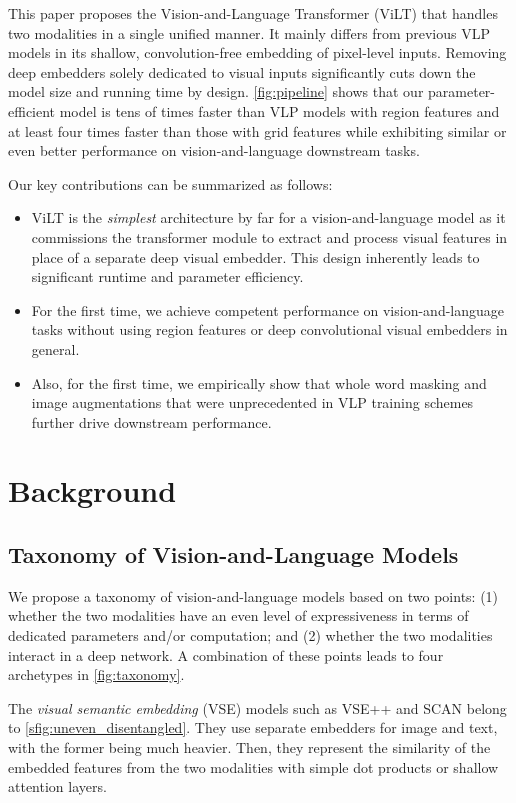 \documentclass{article}
\begin{document}
This paper proposes the Vision-and-Language Transformer (ViLT) that handles two modalities in a single unified manner.
It mainly differs from previous VLP models in its shallow, convolution-free embedding of pixel-level inputs.
Removing deep embedders solely dedicated to visual inputs significantly cuts down the model size and running time by design.
\cref{fig:pipeline} shows that our parameter-efficient model is tens of times faster than VLP models with region features and at least four times faster than those with grid features while exhibiting similar or even better performance on vision-and-language downstream tasks.

Our key contributions can be summarized as follows:
\begin{itemize}
    \item ViLT is the \textit{simplest} architecture by far for a vision-and-language model as it commissions the transformer module to extract and process visual features in place of a separate deep visual embedder. This design inherently leads to significant runtime and parameter efficiency.
    \item For the first time, we achieve competent performance on vision-and-language tasks without using region features or deep convolutional visual embedders in general. 
    \item Also, for the first time, we empirically show that whole word masking and image augmentations that were unprecedented in VLP training schemes further drive downstream performance.
\end{itemize}

\section{Background}
\label{sec:background}

\subsection{Taxonomy of Vision-and-Language Models}

We propose a taxonomy of vision-and-language models based on two points: (1) whether the two modalities have an even level of expressiveness in terms of dedicated parameters and/or computation; and (2) whether the two modalities interact in a deep network.
A combination of these points leads to four archetypes in \cref{fig:taxonomy}.

The \textit{visual semantic embedding} (VSE) models such as VSE++ \citep{faghri2017vse++} and SCAN \citep{lee2018stacked} belong to \cref{sfig:uneven_disentangled}.
They use separate embedders for image and text, with the former being much heavier.
Then, they represent the similarity of the embedded features from the two modalities with simple dot products or shallow attention layers.
\end{document}
